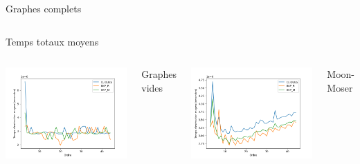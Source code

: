 \documentclass{beamer}
\begin{document}
\begin{frame}
\begin{columns}
    \caption{Graphes complets}
  \end{columns}
  \begin{center}
    Temps totaux moyens
  \end{center}
  \begin{columns}
    \centering
    \includegraphics[width=\textwidth]{images/delay_pivot_empty_plot.png}
    \caption{Graphes vides}
    \centering
    \includegraphics[width=\textwidth]{images/delay_pivot_turan_plot.png}
    \caption{Moon-Moser}
    \centering

\end{columns}
\end{frame}
\end{document}
